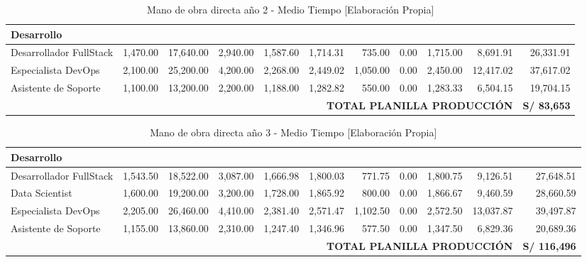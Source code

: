 \begin{table}[H]
\centering
\scriptsize
\renewcommand{\arraystretch}{1.15}
\setlength{\tabcolsep}{3pt}
\begin{tabular}{|l|r|r|r|r|r|r|r|r|r|r|}
\hline
\multicolumn{11}{|l|}{\textbf{Desarrollo}} \\ \hline
Desarrollador FullStack & 1,470.00 & 17,640.00 & 2,940.00 & 1,587.60 & 1,714.31 & 735.00 & 0.00 & 1,715.00 & 8,691.91 & 26,331.91 \\ \hline
Especialista DevOps & 2,100.00 & 25,200.00 & 4,200.00 & 2,268.00 & 2,449.02 & 1,050.00 & 0.00 & 2,450.00 & 12,417.02 & 37,617.02 \\ \hline
Asistente de Soporte & 1,100.00 & 13,200.00 & 2,200.00 & 1,188.00 & 1,282.82 & 550.00 & 0.00 & 1,283.33 & 6,504.15 & 19,704.15 \\ \hline
\multicolumn{10}{|r|}{\textbf{TOTAL PLANILLA PRODUCCIÓN}} & \textbf{S/ 83,653} \\ \hline
\end{tabular}
\caption{Mano de obra directa año 2 - Medio Tiempo [Elaboración Propia]}
\label{fig:mano-obra-directa-anio2}
\end{table}

\begin{table}[H]
\centering
\scriptsize
\renewcommand{\arraystretch}{1.15}
\setlength{\tabcolsep}{3pt}
\begin{tabular}{|l|r|r|r|r|r|r|r|r|r|r|}
\hline
\multicolumn{11}{|l|}{\textbf{Desarrollo}} \\ \hline
Desarrollador FullStack & 1,543.50 & 18,522.00 & 3,087.00 & 1,666.98 & 1,800.03 & 771.75 & 0.00 & 1,800.75 & 9,126.51 & 27,648.51 \\ \hline
Data Scientist & 1,600.00 & 19,200.00 & 3,200.00 & 1,728.00 & 1,865.92 & 800.00 & 0.00 & 1,866.67 & 9,460.59 & 28,660.59 \\ \hline
Especialista DevOps & 2,205.00 & 26,460.00 & 4,410.00 & 2,381.40 & 2,571.47 & 1,102.50 & 0.00 & 2,572.50 & 13,037.87 & 39,497.87 \\ \hline
Asistente de Soporte & 1,155.00 & 13,860.00 & 2,310.00 & 1,247.40 & 1,346.96 & 577.50 & 0.00 & 1,347.50 & 6,829.36 & 20,689.36 \\ \hline
\multicolumn{10}{|r|}{\textbf{TOTAL PLANILLA PRODUCCIÓN}} & \textbf{S/ 116,496} \\ \hline
\end{tabular}
\caption{Mano de obra directa año 3 - Medio Tiempo [Elaboración Propia]}
\label{fig:mano-obra-directa-anio3}
\end{table}

